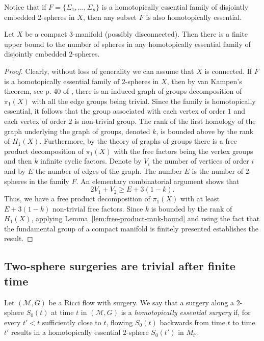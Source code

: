 Notice that if $F=\{\Sigma_1,\ldots,\Sigma_n\}$ is a homotopically
essential family of disjointly  embedded $2$-spheres in $X$, then
any subset $F$ is also homotopically essential.

\begin{lemma}
\label{lem:homotopically-essential-family-finite}
Let $X$ be a compact $3$-manifold (possibly disconnected). Then
there is a finite upper bound to the number of spheres in any
homotopically essential family of disjointly embedded $2$-spheres.
\end{lemma}

\begin{proof}
Clearly, without loss of generality we can assume that $X$ is
connected. If $F$ is a homotopically essential family of $2$-spheres
in $X$, then by van Kampen's theorem, see p. 40 of \cite{Hatcher},
there is an induced graph of groups decomposition of $\pi_1(X)$ with
all the edge groups being trivial. Since the family is homotopically
essential, it follows that the group associated with each vertex of
order $1$ and each vertex of order $2$ is non-trivial group. The
rank of the first homology of the graph underlying the graph of
groups, denoted $k$, is bounded above by the rank of $H_1(X)$.
Furthermore, by the theory of graphs of groups there is a free
product decomposition of $\pi_1(X)$ with the free factors being the
vertex groups and then $k$ infinite cyclic factors. Denote by $V_i$
the number of vertices of order $i$ and by $E$ the number of edges
of the graph. The number $E$ is the number of $2$-spheres in the
family $F$.
 An elementary combinatorial argument shows that
$$2V_1+V_2\ge E+3(1-k).$$
Thus, we have a free product decomposition of $\pi_1(X)$ with at least
$E+3(1-k)$ non-trivial free factors. Since $k$ is bounded by the rank of
$H_1(X)$,
 applying
Lemma~\ref{lem:free-product-rank-bound} and using the fact that the fundamental group of a
compact manifold is finitely presented establishes the result.
\end{proof}

\subsection{Two-sphere surgeries are trivial after finite
time}



\begin{definition}
\label{def:homotopically-essential-surgery}
Let $({\mathcal M},G)$ be a Ricci flow with surgery. We say that a
surgery along a $2$-sphere $S_0(t)$ at time $t$ in $({\mathcal
M},G)$ is a {\em homotopically essential surgery} if, for every
$t'<t$ sufficiently close to $t$,  flowing  $S_0(t)$ backwards from
time $t$ to time $t'$ results in a homotopically essential
$2$-sphere $S_0(t')$ in $M_{t'}$.
\end{definition}


